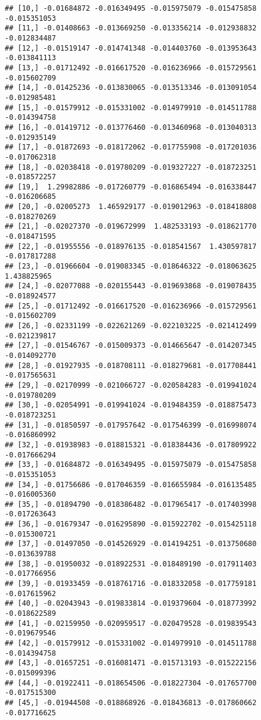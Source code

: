 \documentclass[
]{article}
\begin{document}
\begin{verbatim}
## [10,] -0.01684872 -0.016349495 -0.015975079 -0.015475858 -0.015351053
## [11,] -0.01408663 -0.013669250 -0.013356214 -0.012938832 -0.012834487
## [12,] -0.01519147 -0.014741348 -0.014403760 -0.013953643 -0.013841113
## [13,] -0.01712492 -0.016617520 -0.016236966 -0.015729561 -0.015602709
## [14,] -0.01425236 -0.013830065 -0.013513346 -0.013091054 -0.012985481
## [15,] -0.01579912 -0.015331002 -0.014979910 -0.014511788 -0.014394758
## [16,] -0.01419712 -0.013776460 -0.013460968 -0.013040313 -0.012935149
## [17,] -0.01872693 -0.018172062 -0.017755908 -0.017201036 -0.017062318
## [18,] -0.02038418 -0.019780209 -0.019327227 -0.018723251 -0.018572257
## [19,]  1.29982886 -0.017260779 -0.016865494 -0.016338447 -0.016206685
## [20,] -0.02005273  1.465929177 -0.019012963 -0.018418808 -0.018270269
## [21,] -0.02027370 -0.019672999  1.482533193 -0.018621770 -0.018471595
## [22,] -0.01955556 -0.018976135 -0.018541567  1.430597817 -0.017817288
## [23,] -0.01966604 -0.019083345 -0.018646322 -0.018063625  1.438825965
## [24,] -0.02077088 -0.020155443 -0.019693868 -0.019078435 -0.018924577
## [25,] -0.01712492 -0.016617520 -0.016236966 -0.015729561 -0.015602709
## [26,] -0.02331199 -0.022621269 -0.022103225 -0.021412499 -0.021239817
## [27,] -0.01546767 -0.015009373 -0.014665647 -0.014207345 -0.014092770
## [28,] -0.01927935 -0.018708111 -0.018279681 -0.017708441 -0.017565631
## [29,] -0.02170999 -0.021066727 -0.020584283 -0.019941024 -0.019780209
## [30,] -0.02054991 -0.019941024 -0.019484359 -0.018875473 -0.018723251
## [31,] -0.01850597 -0.017957642 -0.017546399 -0.016998074 -0.016860992
## [32,] -0.01938983 -0.018815321 -0.018384436 -0.017809922 -0.017666294
## [33,] -0.01684872 -0.016349495 -0.015975079 -0.015475858 -0.015351053
## [34,] -0.01756686 -0.017046359 -0.016655984 -0.016135485 -0.016005360
## [35,] -0.01894790 -0.018386482 -0.017965417 -0.017403998 -0.017263643
## [36,] -0.01679347 -0.016295890 -0.015922702 -0.015425118 -0.015300721
## [37,] -0.01497050 -0.014526929 -0.014194251 -0.013750680 -0.013639788
## [38,] -0.01950032 -0.018922531 -0.018489190 -0.017911403 -0.017766956
## [39,] -0.01933459 -0.018761716 -0.018332058 -0.017759181 -0.017615962
## [40,] -0.02043943 -0.019833814 -0.019379604 -0.018773992 -0.018622589
## [41,] -0.02159950 -0.020959517 -0.020479528 -0.019839543 -0.019679546
## [42,] -0.01579912 -0.015331002 -0.014979910 -0.014511788 -0.014394758
## [43,] -0.01657251 -0.016081471 -0.015713193 -0.015222156 -0.015099396
## [44,] -0.01922411 -0.018654506 -0.018227304 -0.017657700 -0.017515300
## [45,] -0.01944508 -0.018868926 -0.018436813 -0.017860662 -0.017716625

\end{verbatim}
\end{document}
